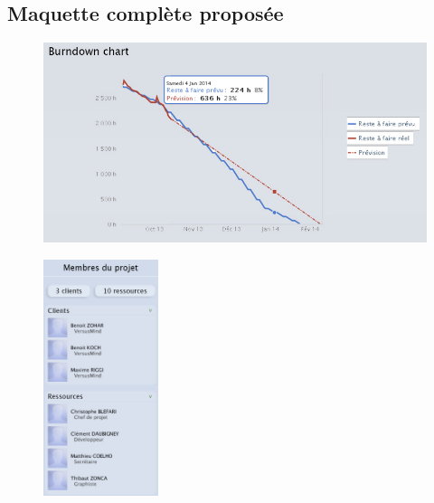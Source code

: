 \documentclass[12pt]{report}
\begin{document}
\begin{appendices}
	\chapter{Maquette complète proposée}
	
	\begin{figure}[H]
	\centering
	\includegraphics[width=1\textwidth]{pictures/notreMaquette/burndown.jpg}
	\caption{}
	\label{10}
\end{figure}

\begin{figure}[H]
	\centering
	\includegraphics[width=0.3\textwidth]{pictures/notreMaquette/barreMembres.jpg}
	\caption{}
	\label{11}
\end{figure}
	

\end{appendices}
\end{document}
